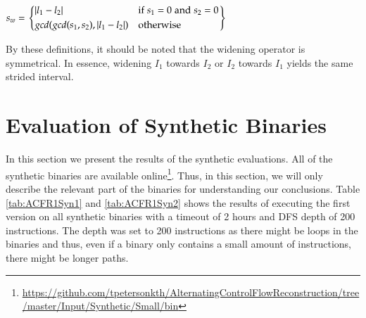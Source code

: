 \documentclass{kththesis}
\begin{document}
\begin{center}
 $s_w = 
\begin{rcases}
    \begin{dcases}
        \lvert l_1-l_2 \rvert & \text{if}\;s_1 = 0\; \text{and} \; s_2 = 0\\
        gcd(gcd(s_1,s_2),\lvert l_1-l_2 \rvert) & \text{otherwise}
    \end{dcases}
\end{rcases}
$
\end{center}
By these definitions, it should be noted that the widening operator is symmetrical. In essence, widening $I_1$ towards $I_2$ or $I_2$ towards $I_1$ yields the same strided interval.

\section{Evaluation of Synthetic Binaries}\label{sec:synEval}
In this section we present the results of the synthetic evaluations. All of the synthetic binaries are available online\footnote{\url{https://github.com/tpetersonkth/AlternatingControlFlowReconstruction/tree/master/Input/Synthetic/Small/bin}}. Thus, in this section, we will only describe the relevant part of the binaries for understanding our conclusions. Table \ref{tab:ACFR1Syn1} and \ref{tab:ACFR1Syn2} shows the results of executing the first version on all synthetic binaries with a timeout of 2 hours and DFS depth of 200 instructions. The depth was set to 200 instructions as there might be loops in the binaries and thus, even if a binary only contains a small amount of instructions, there might be longer paths.
\end{document}
